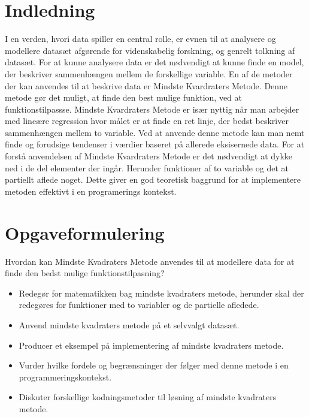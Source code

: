 \section{Indledning}\label{sec:indledning}
I en verden, hvori data spiller en central rolle, er evnen til at analysere og modellere datasæt afgørende for videnskabelig forskning, og genrelt tolkning af datasæt. For at kunne analysere data er det nødvendigt at kunne finde en model, der beskriver sammenhængen mellem de forskellige variable. En af de metoder der kan anvendes til at beskrive data er Mindste Kvardraters Metode. Denne metode gør det muligt, at finde den best mulige funktion, ved at funktionstilpassse. Mindste Kvardraters Metode er især nyttig når man arbejder med lineære regression hvor målet er at finde en ret linje, der bedst beskriver sammenhængen mellem to variable. Ved at anvende denne metode kan man nemt finde og forudsige tendenser i værdier baseret på allerede eksisernede data. For at forstå anvendelsen af Mindste Kvardraters Metode er det nødvendigt at dykke ned i de del elementer der ingår. Herunder funktioner af to variable og det at partiellt aflede noget. Dette giver en god teoretisk baggrund for at implementere metoden effektivt i en programerings kontekst. %
\section{Opgaveformulering}\label{sec:opgaveformulering}
Hvordan kan Mindste Kvadraters Metode anvendes til at modellere data for at finde den bedst mulige funktionstilpasning?
\begin{itemize}
    \item Redegør for matematikken bag mindste kvadraters metode, herunder skal der redegøres for funktioner med to variabler og de partielle afledede.
    \item Anvend mindste kvadraters metode på et selvvalgt datasæt.
    \item Producer et eksempel på implementering af mindste kvadraters metode.
    \item Vurder hvilke fordele og begrænsninger der følger med denne metode i en programmeringskontekst.
    \item Diskuter forskellige kodningsmetoder til løsning af mindste kvadraters metode. 
\end{itemize}
\newpage
